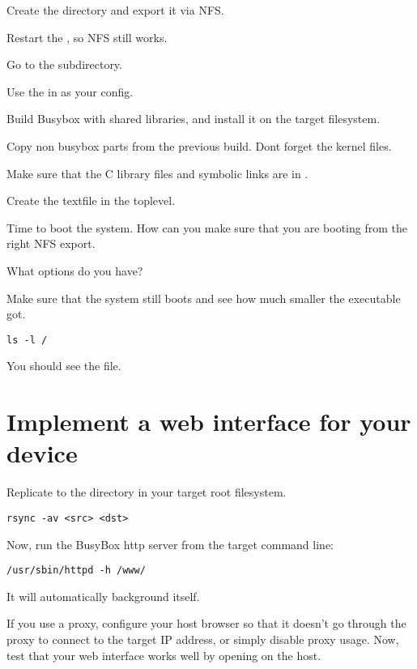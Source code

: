 Create the  directory and export it via NFS.

Restart the , so NFS still works.

Go to the  subdirectory.

Use the  in  as your config.

Build Busybox with shared libraries, and install it on the target filesystem. 

Copy non busybox parts from the previous build. Dont forget the kernel files.

Make sure that the C library files and symbolic links are in .

Create the  textfile in the toplevel.

Time to boot the system. How can you make sure that 
you are booting from the right NFS export.

What options do you have?

Make sure that the system still boots and see
how much smaller the  executable got.


\begin{verbatim}
ls -l /
\end{verbatim}

You should see the  file.

\section{Implement a web interface for your device}

Replicate  to the  directory in your target root filesystem.

\begin{verbatim}
rsync -av <src> <dst>
\end{verbatim}

Now, run the BusyBox http server from the target command line:

\begin{verbatim}
/usr/sbin/httpd -h /www/
\end{verbatim}

It will automatically background itself.

If you use a proxy, configure your host browser so that it doesn't go
through the proxy to connect to the target IP address, or simply
disable proxy usage.  Now, test that your web interface works well by
opening  on the host.


